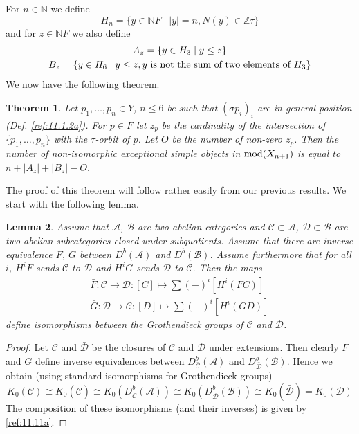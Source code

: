 \documentclass{amsproc}
\def \ZZ{{\mathbb Z}}
\def \NN{{\mathbb N}}
\def\Ascr{{\mathcal A}}
\def\Bscr{{\mathcal B}}
\def\Cscr{{\mathcal C}}
\def\Dscr{{\mathcal D}}
\def\mod{\mathop{\text{mod}}}
\def\r{\rightarrow}
\let\oldtext\text
\def\text#1{\oldtext{\upshape #1}}
\newtheorem{lemmas}{Lemma}[subsection]
\newtheorem{theorems}[lemmas]{Theorem}
\theoremstyle{definition}
\theoremstyle{remark}
\numberwithin{equation}{section}
\numberwithin{table}{section}
\numberwithin{figure}{section}
\begin{document}
For $n\in \NN$ we define
\[
H_n=\{y\in \NN F\mid |y|=n,N(y)\in \ZZ\tau\}
\]
and for  $z\in \NN F$ we also define
\begin{gather*}
  A_z=\{y\in H_3\mid y\le z\}\\
  B_z=\{y\in H_6\mid y\le z, \text{$y$ is not the sum of two elements of
    $H_3$}\}
\end{gather*}
We now have the following theorem.
\begin{theorems}
\label{ref:11.2.1a}
Let $p_1,\ldots,p_n\in Y$, $n\le 6$ be such that $(\sigma p_i)_i$ are
in general position (Def. \ref{ref:11.1.2a}).  For $p\in F$ let
$z_p$ be the cardinality of the intersection of $\{p_1,\ldots,p_n\}$
with the $\tau$-orbit of $p$. Let $O$ be the number of non-zero $z_p$.
Then the number of non-isomorphic exceptional simple objects in
$\mod(X_{n+1})$ is equal to $ n+|A_z|+|B_z|-O $.
\end{theorems}
The proof of this theorem will follow rather easily from our previous
results.  We start with the following lemma.
\begin{lemmas}
\label{ref:11.2.2a} Assume that $\Ascr$, $\Bscr$ are two abelian categories
and $\Cscr\subset\Ascr$, $\Dscr\subset \Bscr$ are two abelian
subcategories closed under subquotients. Assume that there are inverse equivalence $F$, $G$
between $D^b(\Ascr)$ and $D^b(\Bscr)$. Assume furthermore that for all
$i$, $H^iF$ sends $\Cscr$ to $\Dscr$ and $H^iG$ sends $\Dscr$ to
$\Cscr$. Then the maps
\begin{equation}
\label{ref:11.11a}
\begin{gathered}
\bar{F}:\Cscr\r\Dscr:[C]\mapsto \sum (-)^i [H^i(FC)]\\
\bar{G}:\Dscr\r \Cscr:[D]\mapsto \sum (-)^i [H^i(GD)]
\end{gathered}
\end{equation}
define isomorphisms between the Grothendieck groups of $\Cscr$ and
$\Dscr$. 
\end{lemmas}
\begin{proof}  Let $\bar{\Cscr}$ and $\bar{\Dscr}$ be the closures of
  $\Cscr$ and $\Dscr$ under extensions. Then clearly $F$ and $G$
  define inverse equivalences between $D^b_{\bar{\Cscr}}(\Ascr)$ and
  $D^b_{\bar{\Dscr}}(\Bscr)$. Hence we obtain (using standard
  isomorphisms for Grothendieck groups)
\[
K_0(\Cscr)
\cong K_0(\bar{\Cscr})\cong K_0(D^b_{\bar{\Cscr}}(\Ascr))
\cong K_0(D^b_{\bar{\Dscr}}(\Bscr))\cong K_0(\bar{\Dscr})=K_0(\Dscr)
\]
The composition of these isomorphisms (and their inverses) is given by
\eqref{ref:11.11a}.
\end{proof}
\end{document}
